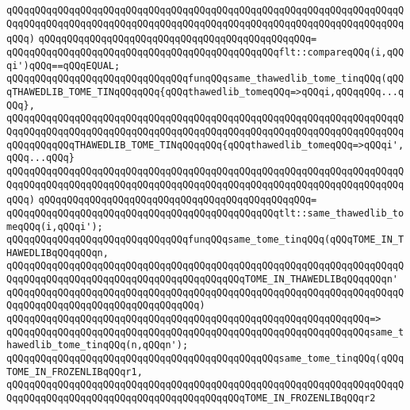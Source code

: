 \verb|qQQqqQQqqQQqqQQqqQQqqQQqqQQqqQQqqQQqqQQqqQQqqQQqqQQqqQQqqQQqqQQqqQQqqQQqqQQqqQQqqQQqqQQqqQQqqQQqqQQqqQQqqQQqqQQqqQQqqQQqqQQqqQQqqQQqqQQqqQQqqQQq)|\newline
\verb|qQQqqQQqqQQqqQQqqQQqqQQqqQQqqQQqqQQqqQQqqQQqqQQq=|\newline
\verb|qQQqqQQqqQQqqQQqqQQqqQQqqQQqqQQqqQQqqQQqqQQqqQQqflt::compareqQQq(i,qQQqi')qQQq==qQQqEQUAL;|\newline
\newline
\newline
\verb|qQQqqQQqqQQqqQQqqQQqqQQqqQQqqQQqfunqQQqsame_thawedlib_tome_tinqQQq(qQQqTHAWEDLIB_TOME_TINqQQqqQQq{qQQqthawedlib_tomeqQQq=>qQQqi,qQQqqQQq...qQQq},|\newline
\verb|qQQqqQQqqQQqqQQqqQQqqQQqqQQqqQQqqQQqqQQqqQQqqQQqqQQqqQQqqQQqqQQqqQQqqQQqqQQqqQQqqQQqqQQqqQQqqQQqqQQqqQQqqQQqqQQqqQQqqQQqqQQqqQQqqQQqqQQqqQQqqQQqqQQqqQQqTHAWEDLIB_TOME_TINqQQqqQQq{qQQqthawedlib_tomeqQQq=>qQQqi',qQQq...qQQq}|\newline
\verb|qQQqqQQqqQQqqQQqqQQqqQQqqQQqqQQqqQQqqQQqqQQqqQQqqQQqqQQqqQQqqQQqqQQqqQQqqQQqqQQqqQQqqQQqqQQqqQQqqQQqqQQqqQQqqQQqqQQqqQQqqQQqqQQqqQQqqQQqqQQqqQQq)|\newline
\verb|qQQqqQQqqQQqqQQqqQQqqQQqqQQqqQQqqQQqqQQqqQQqqQQq=|\newline
\verb|qQQqqQQqqQQqqQQqqQQqqQQqqQQqqQQqqQQqqQQqqQQqqQQqtlt::same_thawedlib_tomeqQQq(i,qQQqi');|\newline
\newline
\newline
\verb|qQQqqQQqqQQqqQQqqQQqqQQqqQQqqQQqfunqQQqsame_tome_tinqQQq(qQQqTOME_IN_THAWEDLIBqQQqqQQqn,|\newline
\verb|qQQqqQQqqQQqqQQqqQQqqQQqqQQqqQQqqQQqqQQqqQQqqQQqqQQqqQQqqQQqqQQqqQQqqQQqqQQqqQQqqQQqqQQqqQQqqQQqqQQqqQQqqQQqqQQqTOME_IN_THAWEDLIBqQQqqQQqn'|\newline
\verb|qQQqqQQqqQQqqQQqqQQqqQQqqQQqqQQqqQQqqQQqqQQqqQQqqQQqqQQqqQQqqQQqqQQqqQQqqQQqqQQqqQQqqQQqqQQqqQQqqQQqqQQq)|\newline
\verb|qQQqqQQqqQQqqQQqqQQqqQQqqQQqqQQqqQQqqQQqqQQqqQQqqQQqqQQqqQQqqQQq=>|\newline
\verb|qQQqqQQqqQQqqQQqqQQqqQQqqQQqqQQqqQQqqQQqqQQqqQQqqQQqqQQqqQQqqQQqsame_thawedlib_tome_tinqQQq(n,qQQqn');|\newline
\newline
\verb|qQQqqQQqqQQqqQQqqQQqqQQqqQQqqQQqqQQqqQQqqQQqqQQqsame_tome_tinqQQq(qQQqTOME_IN_FROZENLIBqQQqr1,|\newline
\verb|qQQqqQQqqQQqqQQqqQQqqQQqqQQqqQQqqQQqqQQqqQQqqQQqqQQqqQQqqQQqqQQqqQQqqQQqqQQqqQQqqQQqqQQqqQQqqQQqqQQqqQQqqQQqqQQqTOME_IN_FROZENLIBqQQqr2|\newline
